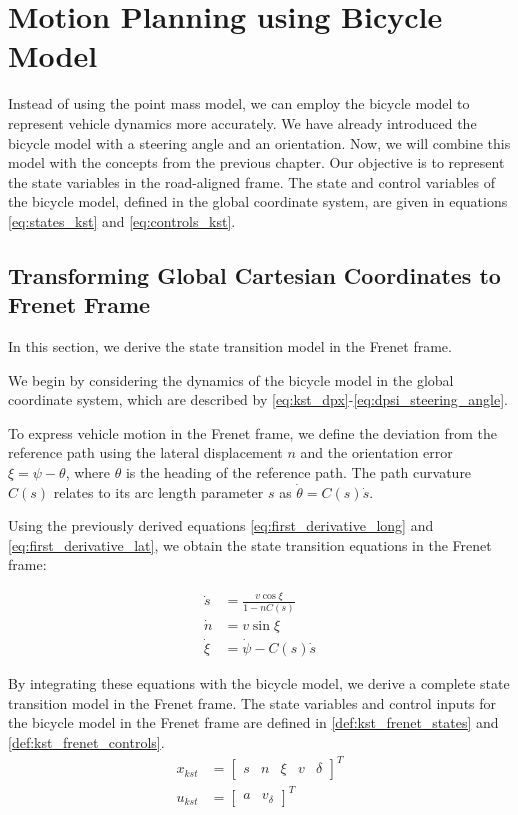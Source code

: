 \section{Motion Planning using Bicycle Model} \label{sec:motion_planning_using_bicylce}
Instead of using the point mass model, we can employ the bicycle model to represent vehicle dynamics more accurately.
We have already introduced the bicycle model with a steering angle and an orientation.
Now, we will combine this model with the concepts from the previous chapter.
Our objective is to represent the state variables in the road-aligned frame.
The state and control variables of the bicycle model, defined in the global coordinate system, are given in equations \eqref{eq:states_kst} and
\eqref{eq:controls_kst}.

\subsection{Transforming Global Cartesian Coordinates to Frenet Frame} \label{subsec:bicycle_conversion_of_cartesian_to_frenet}

In this section, we derive the state transition model in the Frenet frame.

We begin by considering the dynamics of the bicycle model in the global coordinate system, which are described by
\eqref{eq:kst_dpx}-\eqref{eq:dpsi_steering_angle}.

To express vehicle motion in the Frenet frame, we define the deviation from the reference path using the lateral displacement $n$ and the orientation
error $\xi = \psi - \theta$, where $\theta$ is the heading of the reference path.
The path curvature $C(s)$ relates to its arc length parameter $s$ as $\dot{\theta} = C(s) \dot{s}$.

Using the previously derived equations \eqref{eq:first_derivative_long} and \eqref{eq:first_derivative_lat}, we obtain the state transition equations in the Frenet frame:

\begin{align} \dot{s} &= \frac{v\cos\xi}{1 - nC(s)} \\ \dot{n} &= v\sin\xi \\ \dot{\xi} &= \dot{\psi} - C(s)\dot{s} \end{align}

By integrating these equations with the bicycle model, we derive a complete state transition model in the Frenet frame.
The state variables and control inputs for the bicycle model in the Frenet frame are defined in \eqref{def:kst_frenet_states} and
\eqref{def:kst_frenet_controls}.
\begin{align}
	x_{kst} & = \begin{bmatrix}
		            s & n & \xi & v & \delta
	            \end{bmatrix}^T
	\label{def:kst_frenet_states}        \\[10pt]
	u_{kst} & = \begin{bmatrix}
		            a & v_\delta
	            \end{bmatrix}^T
	\label{def:kst_frenet_controls}
\end{align}

